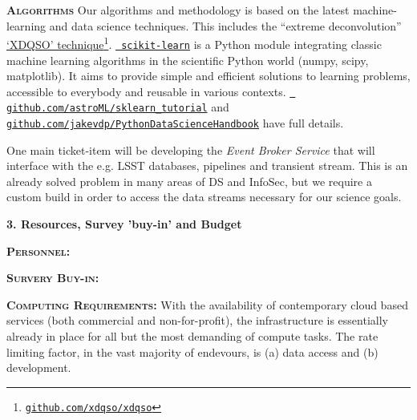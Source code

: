 \documentclass[oneside, a4paper, onecolumn, 11pt]{article}
\begin{document}
\smallskip
\smallskip
\noindent
\textbf{\textsc{Algorithms}}
Our algorithms and methodology is based on the latest machine-learning and data science techniques. 
This includes the ``extreme deconvolution'' \href{http://www.sdss.org/dr14/data\_access/value-added-catalogs/?vac\_id=xdqso/}{`XDQSO' technique}\footnote{\href{https://github.com/xdqso/xdqso}{\tt github.com/xdqso/xdqso}}.
\href{http://ogrisel.github.io/scikit-learn.org/sklearn-tutorial/index.html}{\tt
scikit-learn} is a Python module integrating classic machine learning
algorithms in the scientific Python world (numpy, scipy,
matplotlib). It aims to provide simple and efficient solutions to
learning problems, accessible to everybody and reusable in various
contexts.  \href{https://github.com/astroML/sklearn\_tutorial}{{\tt
github.com/astroML/sklearn\_tutorial}} and \href{https://github.com/jakevdp/PythonDataScienceHandbook}{{\tt github.com/jakevdp/PythonDataScienceHandbook}} have full details.


\smallskip
\smallskip
\noindent
One main ticket-item will be developing the {\it Event Broker Service}
that will interface with the e.g. LSST databases, pipelines and
transient stream. This is an already solved problem in many areas 
of DS and InfoSec, but we require a custom build in order to access 
the data streams necessary for our science goals. 



\smallskip
\smallskip
\noindent
{\bf{\textcolor{Cerulean}{3. Resources,  Survey 'buy-in' and Budget}}}

\smallskip
\smallskip
\noindent
\textbf{\textsc{Personnel:}} 


\smallskip
\smallskip
\noindent
\textbf{\textsc{Survery Buy-in:}} 


\smallskip
\smallskip
\noindent
\textbf{\textsc{Computing Requirements:}} 
With the availability of contemporary cloud based services (both
commercial and non-for-profit), the infrastructure is essentially
already in place for all but the most demanding of compute tasks. The
rate limiting factor, in the vast majority of endevours, is (a) data
access and (b) development.
\end{document}
